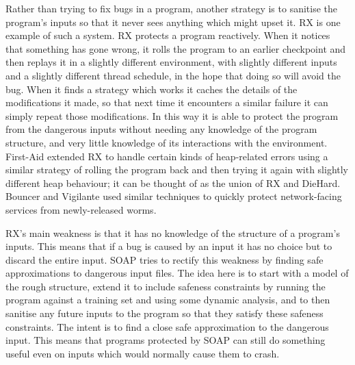 Rather than trying to fix bugs in a program, another strategy is to
sanitise the program's inputs so that it never sees anything which
might upset it.  RX\cite{Qin2007} is one example of such a system.  RX
protects a program reactively.  When it notices that something has
gone wrong, it rolls the program to an earlier checkpoint and then
replays it in a slightly different environment, with slightly
different inputs and a slightly different thread schedule, in the hope
that doing so will avoid the bug.  When it finds a strategy which
works it caches the details of the modifications it made, so that next
time it encounters a similar failure it can simply repeat those
modifications.  In this way it is able to protect the program from the
dangerous inputs without needing any knowledge of the program
structure, and very little knowledge of its interactions with the
environment.  First-Aid\cite{Gao2009} extended RX to handle certain
kinds of heap-related errors using a similar strategy of rolling the
program back and then trying it again with slightly different heap
behaviour; it can be thought of as the union of RX and DieHard.
Bouncer\cite{Costa2007} and Vigilante\cite{Costa2008} used similar
techniques to quickly protect network-facing services from
newly-released worms.

RX's main weakness is that it has no knowledge of the structure of a
program's inputs.  This means that if a bug is caused by an input it
has no choice but to discard the entire input.  SOAP\cite{Long2012}
tries to rectify this weakness by finding safe approximations to
dangerous input files.  The idea here is to start with a model of the
rough structure, extend it to include safeness constraints by running
the program against a training set and using some dynamic analysis,
and to then sanitise any future inputs to the program so that they
satisfy these safeness constraints.  The intent is to find a close
safe approximation to the dangerous input.  This means that programs
protected by SOAP can still do something useful even on inputs which
would normally cause them to crash.

